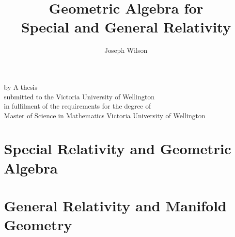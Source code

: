 \newif\ifdebug
\newif\iffinal


% 

\setlength{\parskip}{1em}

\title{Geometric Algebra for \\ Special and General Relativity}
\author{Joseph Wilson}

\makeatletter
\renewcommand\maketitle{
	\begin{center}
		\null\vfill
		{\huge\bfseries\sffamily \@title}
		\vfill
		by
		\vfill
		\@author
		\vfill
		A thesis \\
		submitted to the Victoria University of Wellington \\
		in fulfilment of the requirements for the degree of \\
		Master of Science in Mathematics
		\vfill
		Victoria University of Wellington \\
		\@date
		\vfill
	\end{center}
}
\makeatother




\frontmatter
{} %

	\maketitle
	\thispagestyle{empty}

	
	
	\tableofcontents

\restoregeometry %

\ifdebug
	
\fi

\mainmatter


\part{Special Relativity and Geometric Algebra}
\label{part:1}













\part{General Relativity and Manifold Geometry}
\label{part:2}








